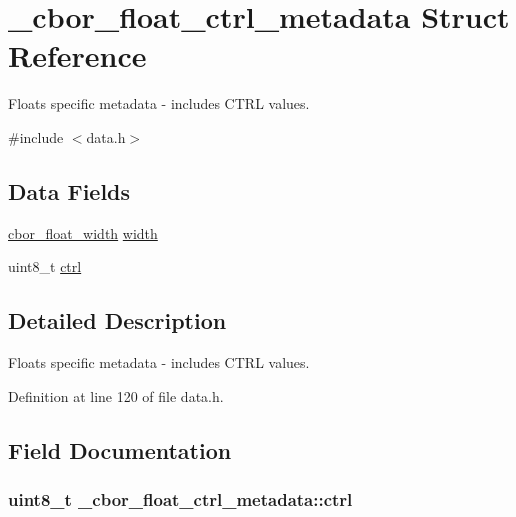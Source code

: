 \hypertarget{struct__cbor__float__ctrl__metadata}{\section{\-\_\-cbor\-\_\-float\-\_\-ctrl\-\_\-metadata Struct Reference}
\label{struct__cbor__float__ctrl__metadata}
}


Floats specific metadata -\/ includes C\-T\-R\-L values.  




{\ttfamily \#include $<$data.\-h$>$}

\subsection*{Data Fields}
\begin{DoxyCompactItemize}
\item 
\hyperlink{data_8h_ac80d3ecbbdc88d96a7396ac986ee47e7}{cbor\-\_\-float\-\_\-width} \hyperlink{struct__cbor__float__ctrl__metadata_a19a1c5e96c662dd4781f0172052b194c}{width}
\item 
uint8\-\_\-t \hyperlink{struct__cbor__float__ctrl__metadata_aeeb531a44e6502b5f1bd2aece6dffaa2}{ctrl}
\end{DoxyCompactItemize}


\subsection{Detailed Description}
Floats specific metadata -\/ includes C\-T\-R\-L values. 

Definition at line 120 of file data.\-h.



\subsection{Field Documentation}
\hypertarget{struct__cbor__float__ctrl__metadata_aeeb531a44e6502b5f1bd2aece6dffaa2}{
\subsubsection[{ctrl}]{\setlength{\rightskip}{0pt plus 5cm}uint8\-\_\-t \-\_\-cbor\-\_\-float\-\_\-ctrl\-\_\-metadata\-::ctrl}}\label{struct__cbor__float__ctrl__metadata_aeeb531a44e6502b5f1bd2aece6dffaa2}


